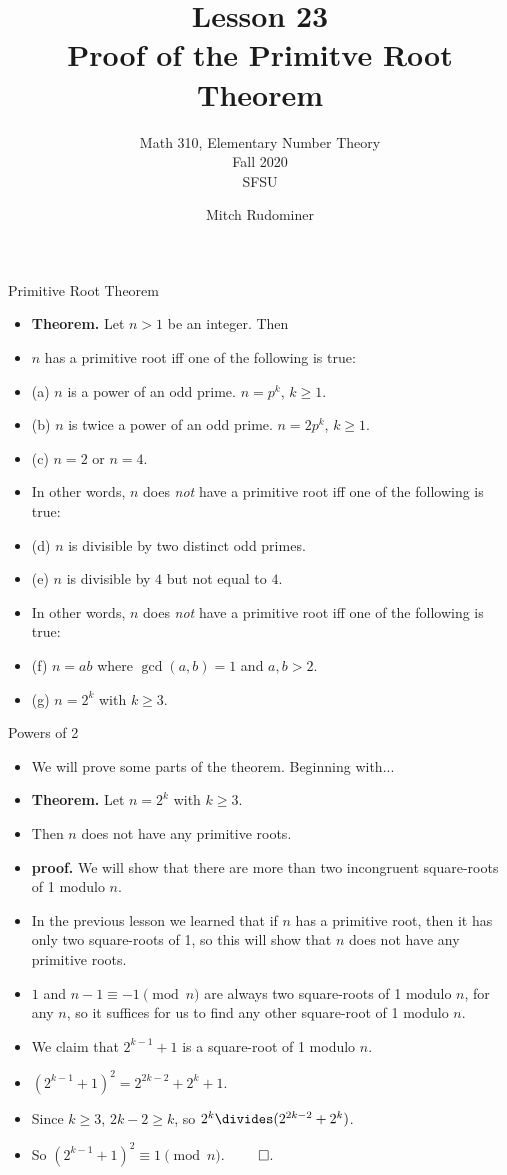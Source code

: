 \documentclass{beamer}
\title{Lesson 23 \\ Proof of the Primitve Root Theorem}
\subtitle{Math 310, Elementary Number Theory \\ Fall 2020 \\ SFSU}
\author{Mitch Rudominer}
\date{}
\begin{document}
\begin{frame}
  \titlepage
\end{frame}

\begin{frame}{Primitive Root Theorem}

\begin{itemize}
  \item \textbf{Theorem.} Let $n>1$ be an integer. Then
  \item $n$ has a primitive root iff one of the following is true:
  \item (a) $n$ is a power of an odd prime. $n=p^k$, $k\geq 1$.
  \item (b) $n$ is twice a power of an odd prime. $n=2p^k$, $k\geq 1$.
  \item (c) $n=2$ or $n=4$.
  \item In other words, $n$ does \emph{not} have a primitive root iff one of the following is true:
  \item (d) $n$ is divisible by two distinct odd primes.
  \item (e) $n$ is divisible by $4$ but not equal to $4$.
  \item In other words, $n$ does \emph{not} have a primitive root iff one of the following is true:
  \item (f) $n=ab$ where $\gcd(a,b)=1$ and $a,b>2$.
  \item (g) $n=2^k$ with $k\geq 3$.
\end{itemize}

\end{frame}

\begin{frame}{Powers of 2}

\begin{itemize}
  \item We will prove some parts of the theorem. Beginning with...
  \item \textbf{Theorem.} Let $n=2^k$ with $k\geq 3$.
  \item Then $n$ does not have any primitive roots.
  \item \textbf{proof.} We will show that there are more than two incongruent square-roots of 1 modulo $n$.
  \item In the previous lesson we learned that if $n$ has a primitive root, then it has only two square-roots of 1, so this will show that $n$ does not have any primitive roots.
  \item $1$ and $n-1 \equiv -1 \pmod n$ are always two square-roots of 1 modulo $n$, for any $n$,
  so it suffices for us to find any other square-root of 1 modulo $n$.
  \item We claim that $2^{k-1}+1$ is a square-root of 1 modulo $n$.
  \item $(2^{k-1}+1)^2 = 2^{2k-2} + 2^k + 1$.
  \item Since $k\geq 3$, $2k-2 \geq k$, so $2^k \divides (2^{2k-2} + 2^k)$.
  \item So $(2^{k-1}+1)^2 \equiv 1 \pmod n$. $\qed$.
\end{itemize}

\end{frame}
\end{document}
